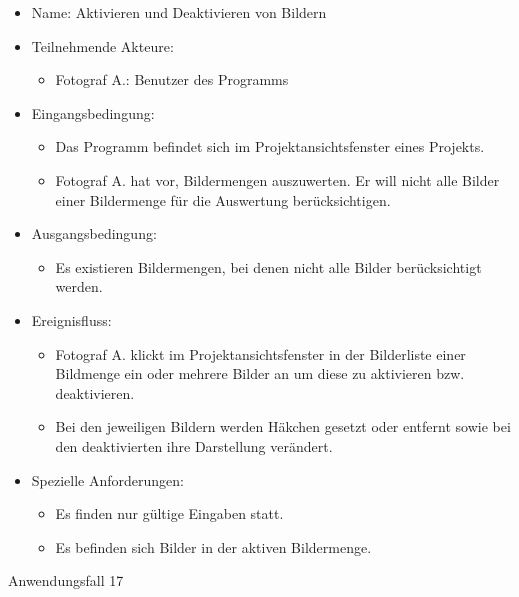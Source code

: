 \begin{itemize}
	\begin{itemize}
		\item Name: Aktivieren und Deaktivieren von Bildern
		\item Teilnehmende Akteure:
		\begin{itemize}
			\item	Fotograf A.: Benutzer des Programms		
		\end{itemize}
		\item Eingangsbedingung:
		\begin{itemize}
			\item	Das Programm befindet sich im Projektansichtsfenster eines Projekts.
			\item Fotograf A. hat vor, Bildermengen auszuwerten. Er will nicht alle Bilder einer Bildermenge für die Auswertung berücksichtigen.
		\end{itemize}
		\item Ausgangsbedingung:
		\begin{itemize}
			\item	Es existieren Bildermengen, bei denen nicht alle Bilder berücksichtigt werden.	
		\end{itemize}
		\item Ereignisfluss:
		\begin{itemize}
			\item Fotograf A. klickt im Projektansichtsfenster in der Bilderliste einer Bildmenge ein oder mehrere Bilder an um diese zu aktivieren bzw. deaktivieren.
			\item Bei den jeweiligen Bildern werden Häkchen gesetzt oder entfernt sowie bei den deaktivierten ihre Darstellung verändert.
		\end{itemize}
		\item Spezielle Anforderungen:
		\begin{itemize}
			\item	Es finden nur gültige Eingaben statt.
			\item Es befinden sich Bilder in der aktiven Bildermenge.
		\end{itemize}			
	\end{itemize}
	
	\begin{description}
		\item[Anwendungsfall 17]
	\end{description}
	

\end{itemize}
